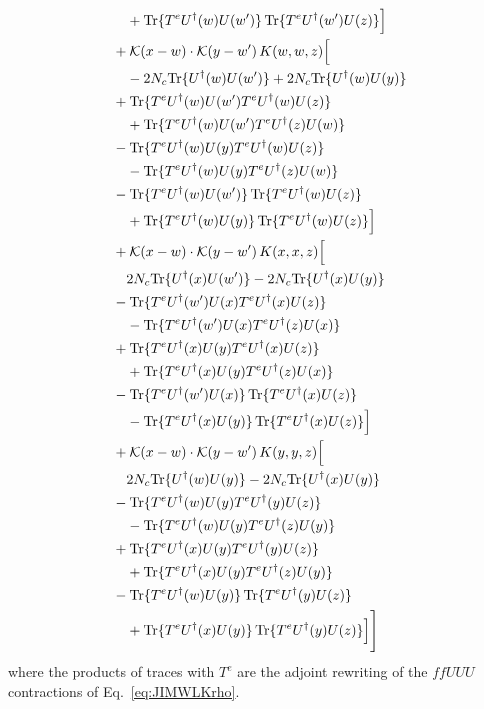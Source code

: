\begin{align}
&\quad+{\rm Tr}\{T^eU^\dagger(w)U(w')\}\,{\rm Tr}\{T^eU^\dagger(w')U(z)\}\Big]\notag\\
&+\mathcal K(x-w)\cdot\mathcal K(y-w')\,K(w,w,z)\Big[\notag\\
&\quad-2 N_{c}{\rm Tr}\{U^\dagger(w)U(w')\}+2 N_{c}{\rm Tr}\{U^\dagger(w)U(y)\}\notag\\
&+{\rm Tr}\{T^eU^\dagger(w)U(w')T^eU^\dagger(w)U(z)\}\notag\\
&\quad+{\rm Tr}\{T^eU^\dagger(w)U(w')T^eU^\dagger(z)U(w)\}\notag\\
&-{\rm Tr}\{T^eU^\dagger(w)U(y)T^eU^\dagger(w)U(z)\}\notag\\
&\quad-{\rm Tr}\{T^eU^\dagger(w)U(y)T^eU^\dagger(z)U(w)\}\notag\\
&-{\rm Tr}\{T^eU^\dagger(w)U(w')\}\,{\rm Tr}\{T^eU^\dagger(w)U(z)\}\notag\\
&\quad+{\rm Tr}\{T^eU^\dagger(w)U(y)\}\,{\rm Tr}\{T^eU^\dagger(w)U(z)\}\Big]\notag\\
&+\mathcal K(x-w)\cdot\mathcal K(y-w')\,K(x,x,z)\Big[\notag\\
&\quad2 N_{c}{\rm Tr}\{U^\dagger(x)U(w')\}-2 N_{c}{\rm Tr}\{U^\dagger(x)U(y)\}\notag\\
&-{\rm Tr}\{T^eU^\dagger(w')U(x)T^eU^\dagger(x)U(z)\}\notag\\
&\quad-{\rm Tr}\{T^eU^\dagger(w')U(x)T^eU^\dagger(z)U(x)\}\notag\\
&+{\rm Tr}\{T^eU^\dagger(x)U(y)T^eU^\dagger(x)U(z)\}\notag\\
&\quad+{\rm Tr}\{T^eU^\dagger(x)U(y)T^eU^\dagger(z)U(x)\}\notag\\
&-{\rm Tr}\{T^eU^\dagger(w')U(x)\}\,{\rm Tr}\{T^eU^\dagger(x)U(z)\}\notag\\
&\quad-{\rm Tr}\{T^eU^\dagger(x)U(y)\}\,{\rm Tr}\{T^eU^\dagger(x)U(z)\}\Big]\notag\\
&+\mathcal K(x-w)\cdot\mathcal K(y-w')\,K(y,y,z)\Big[\notag\\
&\quad2 N_{c}{\rm Tr}\{U^\dagger(w)U(y)\}-2 N_{c}{\rm Tr}\{U^\dagger(x)U(y)\}\notag\\
&-{\rm Tr}\{T^eU^\dagger(w)U(y)T^eU^\dagger(y)U(z)\}\notag\\
&\quad-{\rm Tr}\{T^eU^\dagger(w)U(y)T^eU^\dagger(z)U(y)\}\notag\\
&+{\rm Tr}\{T^eU^\dagger(x)U(y)T^eU^\dagger(y)U(z)\}\notag\\
&\quad+{\rm Tr}\{T^eU^\dagger(x)U(y)T^eU^\dagger(z)U(y)\}\notag\\
&-{\rm Tr}\{T^eU^\dagger(w)U(y)\}\,{\rm Tr}\{T^eU^\dagger(y)U(z)\}\notag\\
&\quad+{\rm Tr}\{T^eU^\dagger(x)U(y)\}\,{\rm Tr}\{T^eU^\dagger(y)U(z)\}\Big]\Bigg]
\end{align} 
where the products of traces with $T^e$ are the adjoint rewriting of the $ffUUU$ contractions of Eq.~\eqref{eq:JIMWLKrho}.

